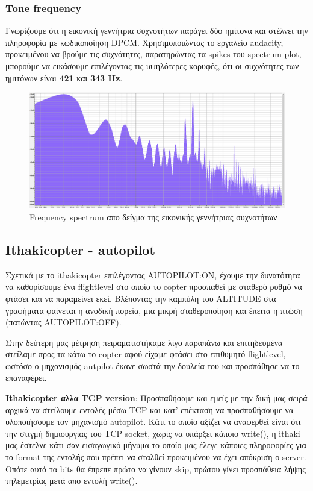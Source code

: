 \documentclass[hidelinks, 12pt, a4paper]{article}
\begin{document}
\subsubsection{Tone frequency}

Γνωρίζουμε ότι η εικονική γεννήτρια συχνοτήτων παράγει δύο ημίτονα και στέλνει την πληροφορία με κωδικοποίηση DPCM. Χρησιμοποιώντας το εργαλείο audacity, προκειμένου να βρούμε τις συχνότητες, παρατηρώντας τα spikes του spectrum plot, μπορούμε να εικάσουμε επιλέγοντας τις υψηλότερες κορυφές, ότι οι συχνότητες των ημιτόνων είναι \textbf{421} και \textbf{343 Hz}.

\begin{figure}[h!]
\centering
	\includegraphics[height=.3\textheight, width=\textwidth]{assets/session1/spectrum.png}
    \caption{Frequency spectrum απο δείγμα της εικονικής γεννήτριας συχνοτήτων}
\end{figure}


\subsection{Ithakicopter - autopilot}

Σχετικά με το ithakicopter επιλέγοντας AUTOPILOT:ON, έχουμε την δυνατότητα να καθορίσουμε ένα flightlevel στο οποίο το copter προσπαθεί με σταθερό ρυθμό να φτάσει και να παραμείνει εκεί. Βλέποντας την καμπύλη του ALTITUDE στα γραφήματα φαίνεται η ανοδική πορεία, μια μικρή σταθεροποίηση και έπειτα η πτώση (πατώντας AUTOPILOT:OFF). 

Στην δεύτερη μας μέτρηση πειραματιστήκαμε λίγο παραπάνω και επιτηδευμένα στείλαμε προς τα κάτω το copter αφού είχαμε φτάσει στο επιθυμητό flightlevel, ωστόσο ο μηχανισμός autpilot έκανε σωστά την δουλεία του και προσπάθησε να το επαναφέρει.


\textbf{Ithakicopter αλλα TCP version}: Προσπαθήσαμε και εμείς με την δική μας σειρά αρχικά να στείλουμε εντολές μέσω TCP και κατ' επέκταση να προσπαθήσουμε να υλοποιήσουμε τον μηχανισμό autopilot. Κάτι το οποίο αξίζει να αναφερθεί είναι ότι την στιγμή δημιουργίας του TCP socket, χωρίς να υπάρξει κάποιο write(), η ithaki μας έστελνε κάτι σαν εισαγωγικό μήνυμα το οποίο μας έλεγε κάποιες πληροφορίες για το format της εντολής που πρέπει να σταλθεί προκειμένου να έχει απόκριση ο server. Οπότε αυτά τα bits θα έπρεπε πρώτα να γίνουν skip, πρώτου γίνει προσπάθεια λήψης τηλεμετρίας μετά απο εντολή write(). 
\end{document}

